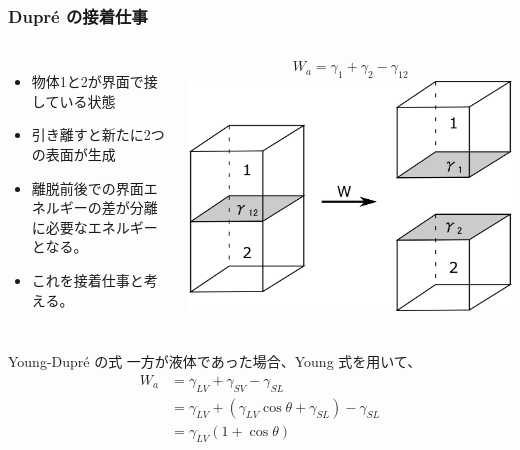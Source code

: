 \documentclass[12pt, dvipdfmx]{beamer}
\begin{document}
\begin{frame}
	\frametitle{Dupr\'{e} の接着仕事}
		\begin{columns}[c, onlytextwidth]
				\begin{itemize}
					\item 物体1と2が界面で接している状態
					\item 引き離すと新たに2つの表面が生成
					\item 離脱前後での界面エネルギーの差が\alert{分離に必要なエネルギー}となる。
					\item これを\alert{接着仕事}と考える。
				\end{itemize}

				\vspace{-10mm}
				\begin{align*}
					W_{a} = \gamma_1 + \gamma_2 - \gamma_{12}
				\end{align*}
			\centering
			\includegraphics[width=\textwidth]{settyaku_shigoto.png}
		\end{columns}

		\pause
		\begin{alertblock}{Young-Dupr\'{e} の式}
			一方が液体であった場合、Young 式を用いて、
			\vspace{-5mm}
			\begin{align*}
				W_{a} &= \gamma_{LV} + \gamma_{SV} - \gamma_{SL} \\
				&= \gamma_{LV} + (\gamma_{LV} \cos \theta + \gamma_{SL}) - \gamma_{SL} \\
				&= \gamma_{LV}(1 + \cos \theta)
			\end{align*}
		\end{alertblock}
\end{frame}
\end{document}
